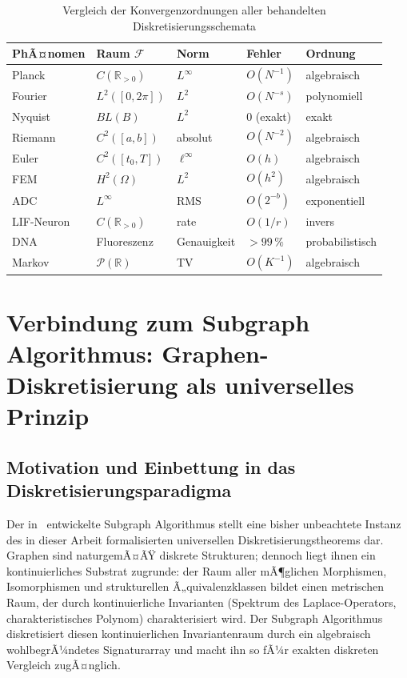 ﻿\documentclass[a4paper,12pt]{article}
\theoremstyle{definition}
\begin{document}
\begin{table}[h]
\centering
\begin{tabular}{lllll}
\toprule
\textbf{PhÃ¤nomen} & \textbf{Raum} $\mathcal{F}$ & \textbf{Norm} & \textbf{Fehler} & \textbf{Ordnung}\\
\midrule
Planck & $C(\mathbb{R}_{>0})$ & $L^\infty$ & $O(N^{-1})$ & algebraisch\\
Fourier & $L^2([0,2\pi])$ & $L^2$ & $O(N^{-s})$ & polynomiell\\
Nyquist & $BL(B)$ & $L^2$ & 0 (exakt) & exakt\\
Riemann & $C^2([a,b])$ & absolut & $O(N^{-2})$ & algebraisch\\
Euler & $C^2([t_0,T])$ & $\ell^\infty$ & $O(h)$ & algebraisch\\
FEM & $H^2(\Omega)$ & $L^2$ & $O(h^2)$ & algebraisch\\
ADC & $L^\infty$ & RMS & $O(2^{-b})$ & exponentiell\\
LIF-Neuron & $C(\mathbb{R}_{>0})$ & rate & $O(1/r)$ & invers\\
DNA & Fluoreszenz & Genauigkeit & $>99\,\%$ & probabilistisch\\
Markov & $\mathcal{P}(\mathbb{R})$ & TV & $O(K^{-1})$ & algebraisch\\
\bottomrule
\end{tabular}
\caption{Vergleich der Konvergenzordnungen aller behandelten Diskretisierungsschemata}
\end{table}

\section{Verbindung zum Subgraph Algorithmus: Graphen-Diskretisierung als universelles Prinzip}
\label{sec:subgraph}

\subsection{Motivation und Einbettung in das Diskretisierungsparadigma}

Der in~\cite{epp2026subgraph} entwickelte Subgraph Algorithmus stellt eine bisher unbeachtete
Instanz des in dieser Arbeit formalisierten universellen Diskretisierungstheorems dar.
Graphen sind naturgemÃ¤ÃŸ diskrete Strukturen; dennoch liegt ihnen ein kontinuierliches Substrat
zugrunde: der Raum aller mÃ¶glichen Morphismen, Isomorphismen und strukturellen
Ã„quivalenzklassen bildet einen metrischen Raum, der durch kontinuierliche Invarianten
(Spektrum des Laplace-Operators, charakteristisches Polynom) charakterisiert wird.
Der Subgraph Algorithmus diskretisiert diesen kontinuierlichen Invariantenraum durch ein
algebraisch wohlbegrÃ¼ndetes Signaturarray und macht ihn so fÃ¼r exakten diskreten Vergleich
zugÃ¤nglich.
\end{document}
